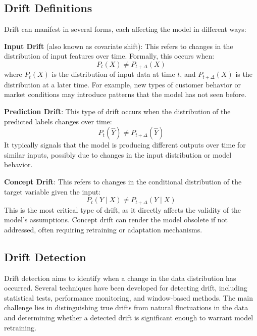\subsection*{Drift Definitions}\label{subsec:drift_definitions}
Drift can manifest in several forms, each affecting the model in different
ways:

\textbf{Input Drift} (also known as covariate shift): This refers to changes in the distribution
of input features over time. Formally, this occurs when:
\begin{equation}
    P_t(X) \neq P_{t+\Delta}(X)
\end{equation}
where $ P_t(X) $ is the distribution of input data at time $ t $, and $
    P_{t+\Delta}(X) $ is the distribution at a later time. For example, new types
of customer behavior or market conditions may introduce patterns that the model
has not seen before.

\textbf{Prediction Drift}: This type of drift occurs when the distribution of the predicted
labels changes over time:
\begin{equation}
    P_t(\hat{Y}) \neq P_{t+\Delta}(\hat{Y})
\end{equation}
It typically signals that the model is producing different outputs over time
for similar inputs, possibly due to changes in the input distribution or model
behavior.

\textbf{Concept Drift}: This refers to changes in the conditional distribution of the target
variable given the input:
\begin{equation}
    P_t(Y \mid X) \neq P_{t+\Delta}(Y \mid X)
\end{equation}
This is the most critical type of drift, as it directly affects the validity of
the model's assumptions. Concept drift can render the model obsolete if not
addressed, often requiring retraining or adaptation mechanisms.

\subsection*{Drift Detection}\label{subsec:drift_detection}
Drift detection aims to identify when a change in the data distribution has
occurred. Several techniques have been developed for detecting drift, including
statistical tests, performance monitoring, and window-based methods. The main
challenge lies in distinguishing true drifts from natural fluctuations in the
data and determining whether a detected drift is significant enough to warrant
model retraining.

